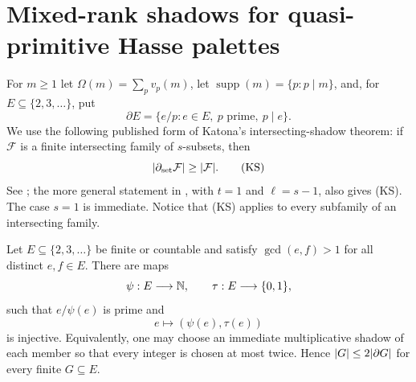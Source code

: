 
\section{Mixed-rank shadows for quasi-primitive Hasse palettes}

For $m\geq1$ let $\Omega(m)=\sum_pv_p(m)$, let
$\operatorname{supp}(m)=\{p:p\mid m\}$, and, for
$E\subseteq\{2,3,\ldots\}$, put
\[
  \partial E=\{e/p:e\in E,\ p\text{ prime},\ p\mid e\}.
\]
We use the following published form of Katona's intersecting-shadow theorem:
if $\mathcal F$ is a finite intersecting family of $s$-subsets, then
\[
  \lvert \partial_{\rm set}\mathcal F\rvert\geq\lvert \mathcal F\rvert.
  \tag{KS}
\]
See \cite{Katona1964}; the more general statement in
\cite[Theorem~1.3]{FranklKatona2021}, with $t=1$ and $\ell=s-1$, also gives
(KS).  The case $s=1$ is immediate.  Notice that (KS) applies to every
subfamily of an intersecting family.

\begin{theorem}\label{thm:mixed-two-shadow}
Let $E\subseteq\{2,3,\ldots\}$ be finite or countable and satisfy
$\gcd(e,f)>1$ for all distinct $e,f\in E$.  There are maps
\[
  \psi:E\longrightarrow\mathbb N,
  \qquad \tau:E\longrightarrow\{0,1\},
\]
such that $e/\psi(e)$ is prime and
\[
  e\longmapsto(\psi(e),\tau(e))
  \tag{MS}
\]
is injective.  Equivalently, one may choose an immediate multiplicative
shadow of each member so that every integer is chosen at most twice.  Hence
$\lvert G\rvert\leq2\lvert \partial G\rvert$ for every finite $G\subseteq E$.
\end{theorem}

